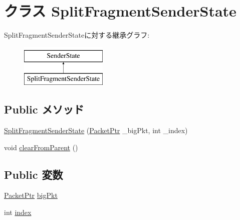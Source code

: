 \hypertarget{classTimingSimpleCPU_1_1SplitFragmentSenderState}{
\section{クラス SplitFragmentSenderState}
\label{classTimingSimpleCPU_1_1SplitFragmentSenderState}
}
SplitFragmentSenderStateに対する継承グラフ:\begin{figure}[H]
\begin{center}
\leavevmode
\includegraphics[height=2cm]{classTimingSimpleCPU_1_1SplitFragmentSenderState}
\end{center}
\end{figure}
\subsection*{Public メソッド}
\begin{DoxyCompactItemize}
\item 
\hyperlink{classTimingSimpleCPU_1_1SplitFragmentSenderState_ae73b8316523497e5139ed6765e33f44a}{SplitFragmentSenderState} (\hyperlink{classPacket}{PacketPtr} \_\-bigPkt, int \_\-index)
\item 
void \hyperlink{classTimingSimpleCPU_1_1SplitFragmentSenderState_aef30187d34647a597501907f985a6bda}{clearFromParent} ()
\end{DoxyCompactItemize}
\subsection*{Public 変数}
\begin{DoxyCompactItemize}
\item 
\hyperlink{classPacket}{PacketPtr} \hyperlink{classTimingSimpleCPU_1_1SplitFragmentSenderState_a1f11d078171aa3ef13844efa89925ae5}{bigPkt}
\item 
int \hyperlink{classTimingSimpleCPU_1_1SplitFragmentSenderState_a750b5d744c39a06bfb13e6eb010e35d0}{index}
\end{DoxyCompactItemize}


